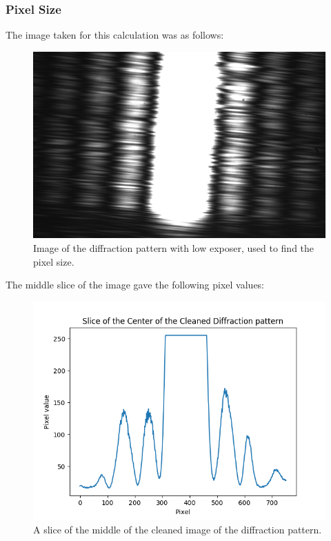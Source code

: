 \documentclass{emulateapj}
\begin{document}
\subsubsection{Pixel Size}
\label{sec:resPixSize}

The image taken for this calculation was as follows:

\begin{figure}[H]
\centering
\includegraphics[scale=0.2]{3_1.png}
\caption{Image of the diffraction pattern with low exposer, used to find the pixel size.}
\label{img:rawPixSize}
\end{figure}

The middle slice of the image gave the following pixel values:

\begin{figure}[H]
\centering
\includegraphics[scale=0.3]{slice.png}
\caption{A slice of the middle of the cleaned image of the diffraction pattern.}
\label{img:slice}
\end{figure}
\end{document}
